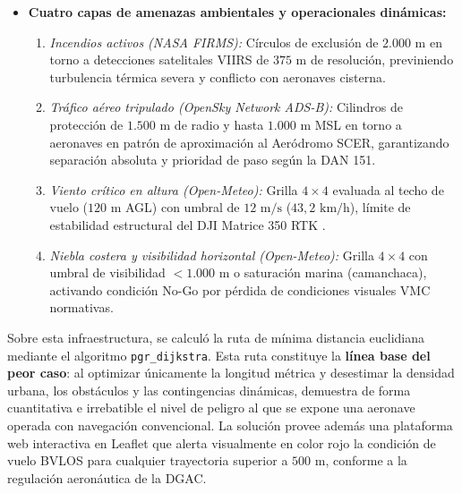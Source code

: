 \documentclass[letterpaper,12pt]{article}
\begin{document}
\begin{itemize}
\begin{enumerate}
        \item \textit{Cobertura celular C2 (OpenStreetMap):} Estimación del enlace de mando y control asumiendo telemetría móvil 4G/LTE sobre mástiles locales en un radio omnidireccional estimado de $3.000\text{ m}$.
        \item \textit{Obstáculos verticales físicos (\texttt{meta\_obstacle}):} Catastro georreferenciado de chimeneas industriales (con cotas de hasta $152\text{ m}$ AGL) y líneas de transmisión eléctrica de alta tensión ($110/220\text{ kV}$) que cruzan los corredores aéreos.
    \end{enumerate}
    \item \textbf{Cuatro capas de amenazas ambientales y operacionales dinámicas:}
    \begin{enumerate}
        \item \textit{Incendios activos (NASA FIRMS):} Círculos de exclusión de $2.000\text{ m}$ en torno a detecciones satelitales VIIRS de $375\text{ m}$ de resolución, previniendo turbulencia térmica severa y conflicto con aeronaves cisterna.
        \item \textit{Tráfico aéreo tripulado (OpenSky Network ADS-B):} Cilindros de protección de $1.500\text{ m}$ de radio y hasta $1.000\text{ m}$ MSL en torno a aeronaves en patrón de aproximación al Aeródromo SCER, garantizando separación absoluta y prioridad de paso según la DAN 151.
        \item \textit{Viento crítico en altura (Open-Meteo):} Grilla $4 \times 4$ evaluada al techo de vuelo ($120\text{ m}$ AGL) con umbral de $12\text{ m/s}$ ($43{,}2\text{ km/h}$), límite de estabilidad estructural del DJI Matrice 350 RTK \cite{dji}.
        \item \textit{Niebla costera y visibilidad horizontal (Open-Meteo):} Grilla $4 \times 4$ con umbral de visibilidad $<1.000\text{ m}$ o saturación marina (camanchaca), activando condición No-Go por pérdida de condiciones visuales VMC normativas.
    \end{enumerate}
\end{itemize}

Sobre esta infraestructura, se calculó la ruta de mínima distancia euclidiana mediante el algoritmo \texttt{pgr\_dijkstra}. Esta ruta constituye la \textbf{línea base del peor caso}: al optimizar únicamente la longitud métrica y desestimar la densidad urbana, los obstáculos y las contingencias dinámicas, demuestra de forma cuantitativa e irrebatible el nivel de peligro al que se expone una aeronave operada con navegación convencional. La solución provee además una plataforma web interactiva en Leaflet que alerta visualmente en color rojo la condición de vuelo BVLOS para cualquier trayectoria superior a $500\text{ m}$, conforme a la regulación aeronáutica de la DGAC.
\end{document}
